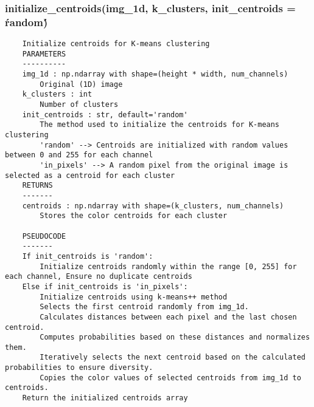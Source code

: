 \subsubsection{initialize\_centroids(img\_1d, k\_clusters, init\_centroids = \'random\')}

\begin{verbatim}
    Initialize centroids for K-means clustering
    PARAMETERS
    ----------
    img_1d : np.ndarray with shape=(height * width, num_channels)
        Original (1D) image
    k_clusters : int
        Number of clusters
    init_centroids : str, default='random'
        The method used to initialize the centroids for K-means clustering
        'random' --> Centroids are initialized with random values between 0 and 255 for each channel
        'in_pixels' --> A random pixel from the original image is selected as a centroid for each cluster
    RETURNS
    -------
    centroids : np.ndarray with shape=(k_clusters, num_channels)
        Stores the color centroids for each cluster

    PSEUDOCODE
    -------
    If init_centroids is 'random':
        Initialize centroids randomly within the range [0, 255] for each channel, Ensure no duplicate centroids
    Else if init_centroids is 'in_pixels':
        Initialize centroids using k-means++ method
        Selects the first centroid randomly from img_1d.
        Calculates distances between each pixel and the last chosen centroid.
        Computes probabilities based on these distances and normalizes them.
        Iteratively selects the next centroid based on the calculated probabilities to ensure diversity.
        Copies the color values of selected centroids from img_1d to centroids.
    Return the initialized centroids array
\end{verbatim}
\pagebreak